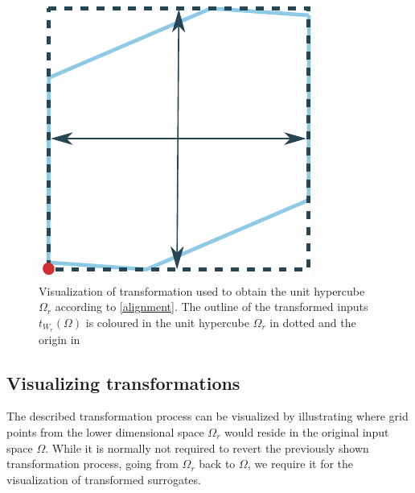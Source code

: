 \documentclass[
  a4paper,  %
  twoside,  %
  bibliography=totoc,
  headsepline,
  cleardoublepage=empty,
  parskip=half,
  draft=false
]{scrbook}
\begin{document}
\begin{mdframed}[style=style]
\begin{figure}[H]

        \centering
\begin{minipage}{.49\textwidth}
        \centering
  \caption{Visualization of transformation used to obtain the unit hypercube $\Omega_r$ according to \cref{alignment}.
  The outline of the transformed inputs $t_{W_r}(\Omega)$ is coloured in \lightbluecomma the unit hypercube $\Omega_r$ in dotted \darkbluecomma and the origin in \reddot}
  \label{fig:aligned}
    \end{minipage}%
    \begin{minipage}{0.49\textwidth}
        \centering
   \includegraphics[width=0.7\linewidth]{graphics/surrogate_space_unit}
    \end{minipage}

\end{figure}
\end{mdframed}


\subsection{Visualizing transformations}
\label{sec:vis_trans}

The described transformation process can be visualized by illustrating where grid points from the lower dimensional space $\Omega_r$ would reside in the original input space $\Omega$. 
While it is normally not required to revert the previously shown transformation process, \ie going from $\Omega_r$ back to $\Omega$, we require it for the visualization of transformed surrogates.
\end{document}
